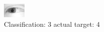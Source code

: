 \begin{figure}[h!]
\begin{center}
\includegraphics[width=0.60\columnwidth]{figures/ID2420_class_3_target_4.png}
\end{center}
\caption{ Classification: 3 actual target: 4}
\label{fig:ID2420_class_3_target_4}
\end{figure}
